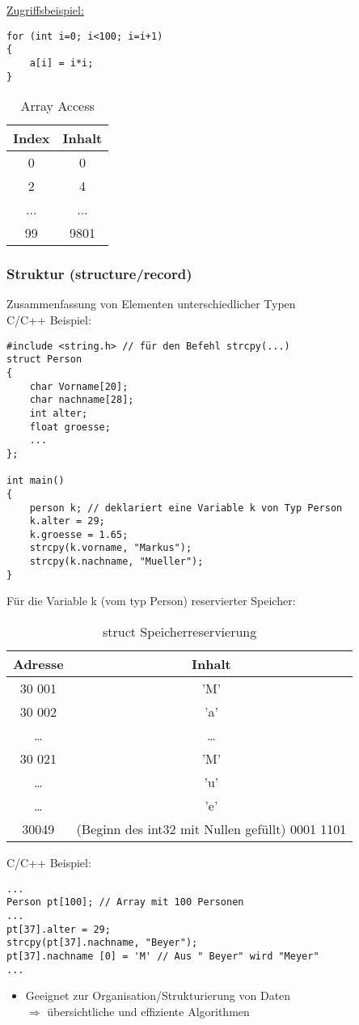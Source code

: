 \underline{Zugriffsbeispiel:}
\begin{lstlisting}
for (int i=0; i<100; i=i+1)
{
	a[i] = i*i;
}
\end{lstlisting}
\begin{table}[h]
	\caption[Array Access Beispiel]{Array Access}
	\begin{center}
	\begin{tabular}{c|c}
		Index & Inhalt\\
		\hline
		0 & 0\\
		2 & 4\\
		... & ...\\
		99 & 9801\\
	\end{tabular}
	\end{center}
\end{table}
\subsubsection{Struktur (structure/record)}
Zusammenfassung von Elementen unterschiedlicher Typen \\
C/C++ Beispiel:
\begin{lstlisting}
#include <string.h> // für den Befehl strcpy(...)
struct Person
{
	char Vorname[20];
	char nachname[28];
	int alter;
	float groesse;
	...
};

int main()
{
	person k; // deklariert eine Variable k von Typ Person 
	k.alter = 29;
	k.groesse = 1.65;
	strcpy(k.vorname, "Markus");
	strcpy(k.nachname, "Mueller");
}
\end{lstlisting}
Für die Variable k (vom typ Person) reservierter Speicher:
\begin{table}[h]
	\caption[struct Speichel]{struct Speicherreservierung}
	\begin{center}
	\begin{tabular}{c|c}
		Adresse & Inhalt\\
		\hline
		30 001 & 'M' \\
		30 002 & 'a' \\
		\dots & \dots \\
		\hline
		30 021 & 'M'\\
		\dots & 'u' \\
		\dots & 'e' \\
		\hline
		30049 &  (Beginn des int32 mit Nullen gefüllt) 0001 1101\\
	\end{tabular}
	\end{center}
\end{table}
C/C++ Beispiel:
\begin{lstlisting}
...
Person pt[100]; // Array mit 100 Personen
...
pt[37].alter = 29;
strcpy(pt[37].nachname, "Beyer");
pt[37].nachname [0] = 'M' // Aus " Beyer" wird "Meyer"
...
\end{lstlisting}
\begin{itemize}
\item Geeignet zur Organisation/Strukturierung von Daten \\
 $\Rightarrow$ übersichtliche und effiziente Algorithmen
\end{itemize}

